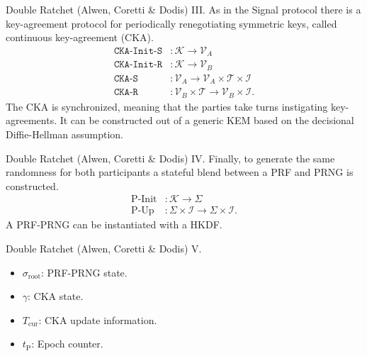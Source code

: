 \documentclass{beamer}
\renewcommand{\t}{\text}
\begin{document}
\begin{frame}{Double Ratchet (Alwen, Coretti \& Dodis) III.}
  As in the Signal protocol there is a key-agreement protocol for periodically
  renegotiating symmetric keys, called continuous key-agreement (CKA).
  \begin{align*}
    \texttt{CKA-Init-S} & : \mathcal{K} \rightarrow \mathcal{V}_A \\
    \texttt{CKA-Init-R} & : \mathcal{K} \rightarrow \mathcal{V}_B \\
    \texttt{CKA-S} & : \mathcal{V}_A \rightarrow
                \mathcal{V}_A \times \mathcal{T} \times \mathcal{I} \\
    \texttt{CKA-R} & : \mathcal{V}_B \times \mathcal{T} \rightarrow
                \mathcal{V}_B \times \mathcal{I}.
  \end{align*}
  The CKA is synchronized, meaning that the parties take turns instigating
  key-agreements. It can be constructed out of a generic KEM based on
  the decisional Diffie-Hellman assumption.
\end{frame}

\begin{frame}{Double Ratchet (Alwen, Coretti \& Dodis) IV.}
  Finally, to generate the same randomness for both participants a stateful
  blend between a PRF and PRNG is constructed.
  \begin{align*}
    \t{P-Init} & : \mathcal{K} \rightarrow \Sigma \\
    \t{P-Up} & : \Sigma \times \mathcal{I} \rightarrow \Sigma \times \mathcal{I}.
  \end{align*}
  A PRF-PRNG can be instantiated with a HKDF.
\end{frame}

\begin{frame}{Double Ratchet (Alwen, Coretti \& Dodis) V.}
  \scriptsize
   \begin{minipage}[h]{0.49\textwidth}
      \begin{figure}[h]
        \centering
        \setlength{\fboxsep}{10pt}
        \scalebox{0.7}{%
        \fbox{%
          
        }
      }
    \end{figure}
    \end{minipage}
   \begin{minipage}[h]{0.49\textwidth}
      \begin{itemize}
      \item $\sigma_\t{root}$: PRF-PRNG state.
      \item $\gamma$: CKA state.
      \item $T_\t{cur}$: CKA update information.
      \item $t_\t{P}$: Epoch counter.
      \end{itemize}
  \end{minipage}
\end{frame}
\end{document}
